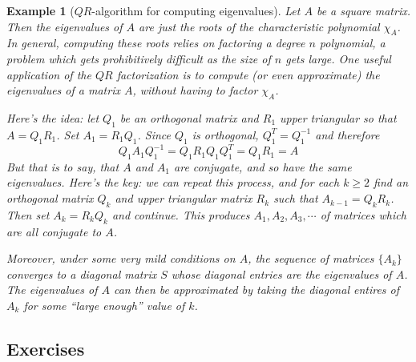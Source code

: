 \documentclass[12pt]{article}
\numberwithin{equation}{subsection}
\numberwithin{figure}{subsection}
\theoremstyle{note}
\newtheorem{example}[subsection]{Example}
\begin{document}
\begin{example}[$QR$-algorithm for computing eigenvalues] \label{ex-QR}
	Let $A$ be a square matrix. Then the eigenvalues of $A$ are just the roots of the characteristic polynomial $\chi_A$.  In general, computing these roots relies on factoring a degree $n$ polynomial, a problem which gets prohibitively difficult as the size of $n$ gets large. One useful application of the $QR$ factorization is to compute (or even approximate) the eigenvalues of a matrix $A$, without having to factor $\chi_A$. 
	
	Here's the idea: let $Q_1$ be an orthogonal matrix and $R_1$ upper triangular so that $A=Q_1R_1$. Set $A_1=R_1Q_1$. Since $Q_1$ is orthogonal, $Q_1^T=Q_1^{-1}$ and therefore \[ Q_1 A_1 Q_1^{-1}=Q_1 R_1 Q_1Q_1^T=Q_1R_1=A
	\] But that is to say, that $A$ and $A_1$ are conjugate, and so have the same eigenvalues. Here's the key: we can repeat this process, and for each $k\geq 2$ find an orthogonal matrix $Q_k$ and upper triangular matrix $R_k$ such that $A_{k-1}=Q_kR_k$. Then set $A_k=R_kQ_k$ and continue. This produces $A_1,A_2,A_3,\cdots$ of matrices which are all conjugate to $A$.
	
	Moreover, under some very mild conditions on $A$, the sequence of matrices $\{A_k\}$ converges to a diagonal matrix $S$ whose diagonal entries are the eigenvalues of $A$. The eigenvalues of $A$ can then be approximated by taking the diagonal entires of $A_k$ for some ``large enough'' value of $k$. %
\end{example}

\subsection{Exercises}
\end{document}

